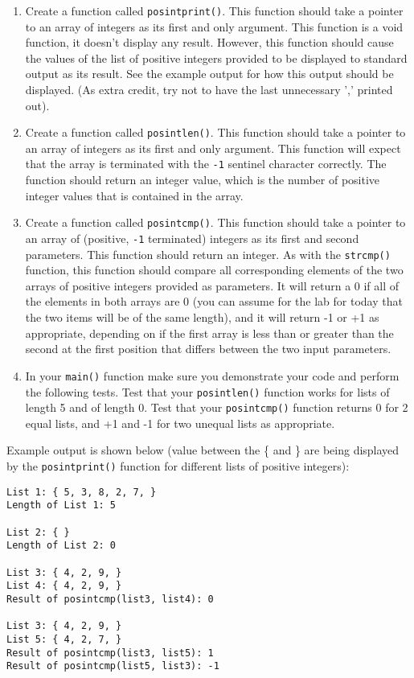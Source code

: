\documentclass[11pt]{article}
\begin{document}
\begin{enumerate}
\item Create a function called \verb~posintprint()~.  This function should take
a pointer to an array of integers as its first and only argument.
This function is a void function, it doesn't display any result.  
However, this function should cause the values of the list of positive
integers provided to be displayed to standard output as its result.
See the example output for how this output should be displayed.
(As extra credit, try not to have the last unnecessary ',' printed out).

\item Create a function called \verb~posintlen()~.  This function should take
a pointer to an array of integers as its first and only argument.
This function will expect that the array is terminated with the
\verb~-1~ sentinel character correctly.  The function should return
an integer value, which is the number of positive integer values
that is contained in the array.

\item Create a function called \verb~posintcmp()~.  This function should take
a pointer to an array of (positive, \verb~-1~ terminated) integers as
its first and second parameters.  This function should return an
integer.  As with the \verb~strcmp()~ function, this function should
compare all corresponding elements of the two arrays of positive
integers provided as parameters.  It will return a 0 if all of the
elements in both arrays are 0 (you can assume for the lab for today
that the two items will be of the same length), and it will return
-1 or +1 as appropriate, depending on if the first array is less
than or greater than the second at the first position that differs
between the two input parameters.

\item In your \verb~main()~ function make sure you demonstrate your code and
perform the following tests.  Test that your \verb~posintlen()~ function
works for lists of length 5 and of length 0.  Test that your 
\verb~posintcmp()~ function returns 0 for 2 equal lists, and +1 and
-1 for two unequal lists as appropriate.
\end{enumerate}

Example output is shown below (value between the \{ and \} are being displayed
by the \verb~posintprint()~ function for different lists of positive integers): 


\begin{verbatim}
List 1: { 5, 3, 8, 2, 7, }
Length of List 1: 5

List 2: { }
Length of List 2: 0

List 3: { 4, 2, 9, }
List 4: { 4, 2, 9, }
Result of posintcmp(list3, list4): 0

List 3: { 4, 2, 9, }
List 5: { 4, 2, 7, }
Result of posintcmp(list3, list5): 1
Result of posintcmp(list5, list3): -1
\end{verbatim}
\end{document}
